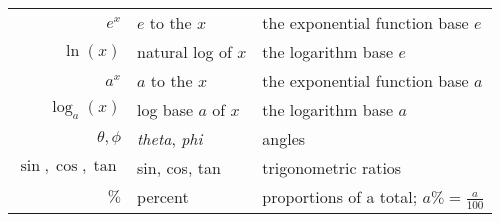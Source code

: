 \begin{longtable}{rll}
$e^x$ 
	& $e$ to the $x$ 
	& the exponential function base $e$ \\
$\ln(x)$ 
	& natural log of $x$ 
	& the logarithm base $e$ 				\\
$a^x$ 
	& $a$ to the $x$ 
	& the exponential function base $a$ \\
$\log_a(x)$ 
	& log base $a$ of $x$ 
	& the logarithm base $a$ 				\\
$\theta,\phi$
	& \emph{theta}, \emph{phi}
	& angles 					\\
$\sin,\cos,\tan$
	& sin, cos, tan 
	& trigonometric ratios 			\\
$\%$
	& percent
	& proportions of a total; $a\%=\frac{a}{100}$ 		\\
\bottomrule
\end{longtable}

